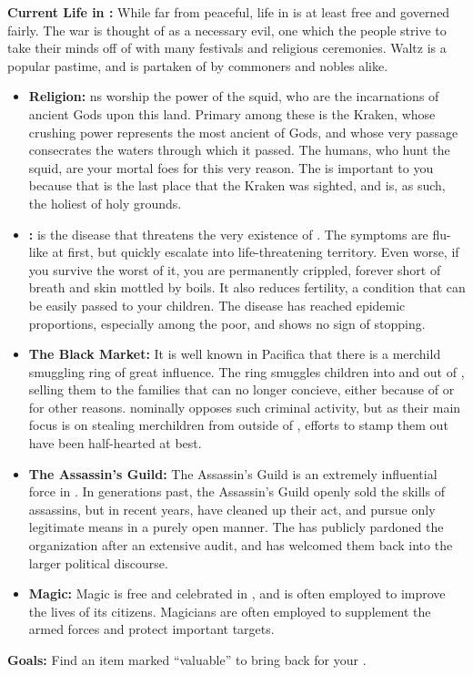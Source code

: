 \documentclass[blue]{NeptuneBall}
\begin{document}
{\bf Current Life in \pPacifica{}:}
While far from peaceful, life in \pPacifica{} is at least free and governed fairly. The war is thought of as a necessary evil, one which the people strive to take their minds off of with many festivals and religious ceremonies. Waltz is a popular pastime, and is partaken of by commoners and nobles alike.\\

\begin{itemize}
  \item {\bf Religion:} \pPacifica{}ns worship the power of the squid, who are the incarnations of ancient Gods upon this land. Primary among these is the Kraken, whose crushing power represents the most ancient of Gods, and whose very passage consecrates the waters through which it passed. The humans, who hunt the squid, are your mortal foes for this very reason. The \pGazaStrip{} is important to you because that is the last place that the Kraken was sighted, and is, as such, the holiest of holy grounds.
  \item {\bf \cPolio{}:} \cPolio{} is the disease that threatens the very existence of \pPacifica{}. The symptoms are flu-like at first, but quickly escalate into life-threatening territory. Even worse, if you survive the worst of it, you are permanently crippled, forever short of breath and skin mottled by boils. It also reduces fertility, a condition that can be easily passed to your children. The disease has reached epidemic proportions, especially among the poor, and shows no sign of stopping. 
  \item {\bf The Black Market:} It is well known in Pacifica that there is a merchild smuggling ring of great influence. The ring smuggles children into and out of \pPacifica{}, selling them to the families that can no longer concieve, either because of \cPolio{} or for other reasons. \cPacificanRuler{\King} \cPacificanRuler{} nominally opposes such criminal activity, but as their main focus is on stealing merchildren from outside of \pPacifica{}, efforts to stamp them out have been half-hearted at best.
  \item {\bf The Assassin's Guild:} The Assassin's Guild is an extremely influential force in \pPacifica{}. In generations past, the Assassin's Guild openly sold the skills of assassins, but in recent years, have cleaned up their act, and pursue only legitimate means in a purely open manner. The \cPacificanRuler{\King} has publicly pardoned the organization after an extensive audit, and has welcomed them back into the larger political discourse.
  \item {\bf Magic:} Magic is free and celebrated in \pPacifica{}, and is often employed to improve the lives of its citizens. Magicians are often employed to supplement the armed forces and protect important targets.
\end{itemize}

{\bf Goals:} Find an item marked "`valuable"' to bring back for your \cPacificanRuler{\King}.
\end{document}
